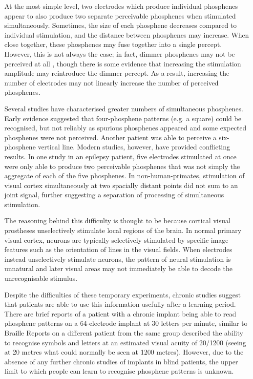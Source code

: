 \documentclass[a4paper,11pt,openany]{book}
\begin{document}
At the most simple level, two electrodes which produce individual phosphenes appear to also produce two separate perceivable phosphenes when stimulated simultaneously.  \cite{brindley_sensations_1968,dobelle_phosphenes_1974}
Sometimes, the size of each phosphene decreases compared to individual stimulation, and the distance between phosphenes may increase. \cite{bosking_rules_2018}
When close together, these phosphenes may fuse together into a single percept. \cite{brindley_sensations_1968,dobelle_phosphenes_1974}
However, this is not always the case; in fact, dimmer phosphenes may not be perceived at all \cite{bosking_rules_2018,dobelle_artificial_1974,dobelle_phosphenes_1974}, though there is some evidence that increasing the stimulation amplitude may reintroduce the dimmer percept. \cite{schmidt_feasibility_1996}
As a result, increasing the number of electrodes may not linearly increase the number of perceived phosphenes.

Several studies have characterised greater numbers of simultaneous phosphenes.
Early evidence suggested that four-phosphene patterns (e.g. a square) could be recognised, but not reliably as spurious phosphenes appeared and some expected phosphenes were not perceived. \cite{dobelle_artificial_1974}
Another patient was able to perceive a six-phosphene vertical line. \cite{schmidt_feasibility_1996}
Modern studies, however, have provided conflicting results.
In one study in an epilepsy patient, five electrodes stimulated at once were only able to produce two perceivable phosphenes that was not simply the aggregate of each of the five phosphenes. \cite{beauchamp_dynamic_2018}
In non-human-primates, stimulation of visual cortex simultaneously at two spacially distant points did not sum to an joint signal, further suggesting a separation of processing of simultaneous stimulation. \cite{ghose_strong_2012}

The reasoning behind this difficulty is thought to be because cortical visual prostheses unselectively stimulate local regions of the brain.
In normal primary visual cortex, neurons are typically selectively stimulated by specific image features such as the orientation of lines in the visual fields. \cite{ben-yishai_theory_1995}
When electrodes instead unselectively stimulate neurons, the pattern of neural stimulation is unnatural and later visual areas may not immediately be able to decode the unrecognisable stimulus. \cite{beauchamp_dynamic_2018}

Despite the difficulties of these temporary experiments, chronic studies suggest that patients are able to use this information usefully after a learning period.
There are brief reports of a patient with a chronic implant being able to read phosphene patterns on a 64-electrode implant at 30 letters per minute, similar to Braille \cite{dobelle_braille_1976}
Reports on a different patient from the same group described the ability to recognise symbols and letters at an estimated visual acuity of 20/1200 (seeing at 20 metres what could normally be seen at 1200 metres). \cite{dobelle_artificial_2000}
However, due to the absence of any further chronic studies of implants in blind patients, the upper limit to which people can learn to recognise phosphene patterns is unknown.
\end{document}
